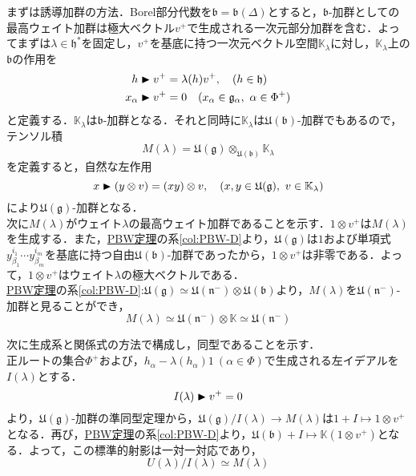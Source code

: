 \documentclass[rep_main]{subfiles}
\begin{document}
まずは誘導加群の方法．Borel部分代数を$\mathfrak{b} = \mathfrak{b}(\Delta)$とすると，$\mathfrak{b}$-加群としての最高ウェイト加群は極大ベクトル$v^+$で生成される一次元部分加群を含む．よってまずは$\lambda \in \mathfrak{h}^*$を固定し，$v^+$を基底に持つ一次元ベクトル空間$\mathbb{K}_\lambda$に対し，$\mathbb{K}_\lambda$上の$\mathfrak{b}$の作用を
\begin{align}
	h \btr v^+ &= \lambda(h) v^+,\quad  (h \in \mathfrak{h}) \\
	x_\alpha \btr v^+ &= 0\quad  (x_\alpha \in \mathfrak{g}_\alpha,\ \alpha \in \Phi^+)
\end{align}
と定義する．$\mathbb{K}_\lambda$は$\mathfrak{b}$-加群となる．それと同時に$\mathbb{K}_\lambda$は$\mathfrak{U}(\mathfrak{b})$-加群でもあるので，テンソル積
\begin{equation}
	M(\lambda) = \mathfrak{U}(\mathfrak{g}) \otimes_{\mathfrak{U}(\mathfrak{b})} \mathbb{K}_\lambda
\end{equation}
を定義すると，自然な左作用
\begin{equation}
	x \blacktriangleright (y \otimes v) = (xy) \otimes v,\quad  (x, y \in \mathfrak{U}(\mathfrak{g}),\ v \in \mathbb{K}_\lambda)
\end{equation}
により$\mathfrak{U}(\mathfrak{g})$-加群となる．\\
次に$M(\lambda)$がウェイト$\lambda$の最高ウェイト加群であることを示す．$1 \otimes v^+$は$M(\lambda)$を生成する．また，\hyperref[thm:PBW]{PBW定理}の系\ref{col:PBW-D}より，$\mathfrak{U}(\mathfrak{g})$は$1$および単項式$y_{\beta_1}^{i_1}\cdots y_{\beta_m}^{i_m}$を基底に持つ自由$\mathfrak{U}(\mathfrak{b})$-加群であったから，$1 \otimes v^+$は非零である．よって，$1 \otimes v^+$はウェイト$\lambda$の極大ベクトルである．\\
\hyperref[thm:PBW]{PBW定理}の系\ref{col:PBW-D}:$\mathfrak{U}(\mathfrak{g}) \simeq \mathfrak{U}(\mathfrak{n}^-) \otimes \mathfrak{U}(\mathfrak{b})$より，$M(\lambda)$を$\mathfrak{U}(\mathfrak{n}^-)$-加群と見ることができ，
\begin{equation}
	M(\lambda) \simeq \mathfrak{U}(\mathfrak{n}^-) \otimes \mathbb{K} \simeq  \mathfrak{U}(\mathfrak{n}^-)
\end{equation}

次に生成系と関係式の方法で構成し，同型であることを示す．\\
正ルートの集合$\Phi^+$および，$h_\alpha - \lambda(h_\alpha)1\ (\alpha \in \Phi)$で生成される左イデアルを$I(\lambda)$とする．
\begin{equation}
	I(\lambda) \blacktriangleright v^+ = 0
\end{equation}
より，$\mathfrak{U}(\mathfrak{g})$-加群の準同型定理から，$\mathfrak{U}(\mathfrak{g}) / I(\lambda) \to M(\lambda)$は$1 + I \mapsto 1\otimes v^+$となる．再び，\hyperref[thm:PBW]{PBW定理}の系\ref{col:PBW-D}より，$\mathfrak{U}(\mathfrak{b}) + I \mapsto \mathbb{K}(1\otimes v^+)$となる．よって，この標準的射影は一対一対応であり，
\begin{equation}
	U(\lambda) / I(\lambda) \simeq M(\lambda)
\end{equation}
\end{document}
